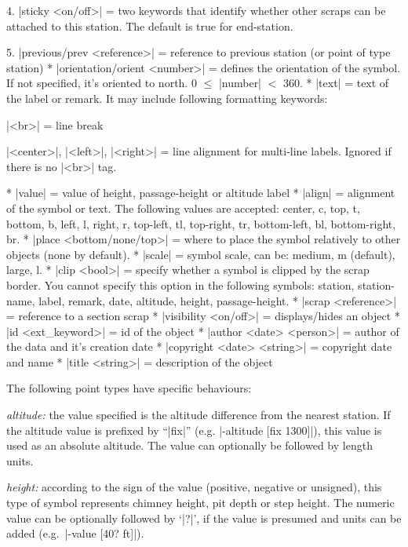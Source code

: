     4. |sticky <on/off>| = two keywords that identify whether other
       scraps can be attached to this station. The default is true for
       end-station.

    5. |previous/prev <reference>| = reference to previous station
       (or point of type station)
  * |orientation/orient <number>| = defines the orientation
    of the symbol. If not specified, it's oriented to north.
    0 $\le$ |number| $<$ 360.
  * |text| = text of the label or remark. It may include following formatting
    keywords:
    
    |<br>| = line break
    
    |<center>|, |<left>|, |<right>| = line alignment for multi-line labels. 
    Ignored if there is no |<br>| tag.
        
  * |value| = value of height, passage-height or altitude label
  * |align| = alignment of the symbol or text. The following values
    are accepted: center, c, top, t, bottom, b, left, l, right, r,
    top-left, tl, top-right, tr, bottom-left, bl, bottom-right, br.
  * |place <bottom/none/top>| = where to place the symbol relatively
    to other objects (none by default).
  * |scale| = symbol scale, can be: medium, m (default), large, l.
  * |clip <bool>| = specify whether a symbol is clipped by the scrap border.
    You cannot specify this option in the following symbols: station,
    station-name, label, remark, date, altitude, height, passage-height.
  * |scrap <reference>| = reference to a section scrap
  * |visibility <on/off>| = displays/hides an object
  * |id <ext_keyword>| = id of the object
  * |author <date> <person>| = author of the data and it's creation date
  * |copyright <date> <string>| = copyright date and name
  * |title <string>| = description of the object
\endoptions

\notes
   The following point types have specific behaviours:
        
   \list
      {\it altitude:} the value specified is the altitude difference from 
      the nearest station. If the altitude value is prefixed by ``|fix|''
      (e.g. |-altitude [fix 1300]|), this value is used as an absolute altitude. 
      The value can optionally be followed by length units.
        
      {\it height:} according to the sign of the value (positive, negative or
      unsigned), this type of symbol represents chimney height, pit depth
      or step height. The numeric value can be optionally followed by `|?|', 
      if the value is presumed and units can be added 
      (e.g.~|-value [40? ft]|).
        
